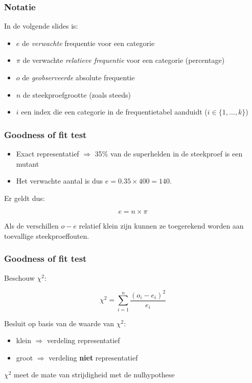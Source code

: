 \documentclass[aspectratio=169]{beamer}
\begin{document}
\begin{frame}
  \frametitle{Notatie}
  
  In de volgende slides is:
  
  \begin{itemize}
    \item $e$ de \textit{verwachte} frequentie voor een categorie
    \item $\pi$ de verwachte \textit{relatieve frequentie} voor een categorie (percentage)
    \item $o$ de \textit{geobserveerde} absolute frequentie
    \item $n$ de steekproefgrootte (zoals steeds)
    \item $i$ een index die een categorie in de frequentietabel aanduidt ($i \in \{1, \ldots, k\}$)
  \end{itemize}
\end{frame}

\begin{frame}
  \frametitle{Goodness of fit test}
  \begin{itemize}
    \item Exact representatief $\Rightarrow$ 35\% van de superhelden in de steekproef is een mutant
    \item Het verwachte aantal is dus $e = 0.35 \times 400 = 140$.
  \end{itemize}
  Er geldt dus:
  
  \[ e = n \times \pi \]
  
  Als de verschillen $o - e$  relatief klein zijn kunnen ze toegerekend worden aan toevallige steekproeffouten.
\end{frame}

\begin{frame}
  \frametitle{Goodness of fit test}
  Beschouw $\chi^{2}$:
  
  \[ \chi^{2} = \sum_{i=1}^{n} \frac{(o_{i} - e_{i})^{2}}{e_{i}} \]
  
  Besluit op basis van de waarde van $\chi^2$:
  \begin{itemize}
    \item klein $\Rightarrow$ verdeling representatief
    \item groot $\Rightarrow$ verdeling \textbf{niet} representatief
  \end{itemize}
  
  $\chi^{2}$ meet de mate van strijdigheid met de nulhypothese
\end{frame}
\end{document}
